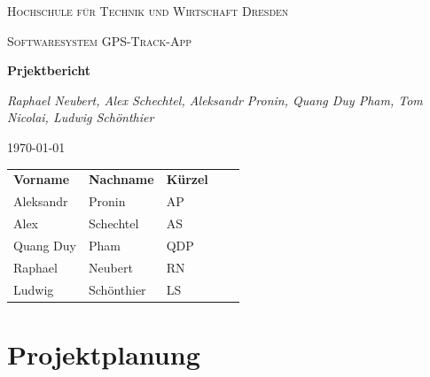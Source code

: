 \documentclass[10pt]{article}
\begin{document}
\begin{titlepage}
    \centering
    {\scshape\LARGE Hochschule für Technik und Wirtschaft Dresden \par}
    \vspace{1cm}
    {\scshape\Large Softwaresystem \glqq GPS-Track-App\grqq\par}
    \vspace{1.5cm}
    {\huge\bfseries Prjektbericht\par}
    \vspace{2cm}
    {\Large\itshape Raphael Neubert, Alex Schechtel, Aleksandr Pronin, Quang Duy Pham, Tom Nicolai, Ludwig Schönthier\par}
    \vfill

    {\large \today\par}
\end{titlepage}
\tableofcontents
\newpage
\begin{table}[H]
    \begin{tabular}{lllll}
    \textbf{Vorname} & \textbf{Nachname} & \textbf{Kürzel} &  &  \\
    Aleksandr        & Pronin            & AP              &  &  \\
    Alex             & Schechtel         & AS              &  &  \\
    Quang Duy        & Pham              & QDP             &  &  \\
    Raphael          & Neubert           & RN              &  &  \\
    Ludwig           & Schönthier        & LS              &  &
    \end{tabular}
\end{table}
\section{Projektplanung}
\end{document}
